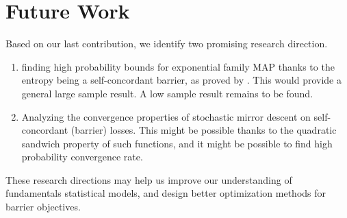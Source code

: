 \section{Future Work}
Based on our last contribution, we identify two promising research direction.
\begin{enumerate}
	\item finding high probability bounds for exponential family MAP thanks to the entropy being a self-concordant barrier, as proved by \citep{bubeck2015entropic}.
	This would provide a general large sample result. A low sample result remains to be found.
	\item Analyzing the convergence properties of  stochastic mirror descent on self-concordant (barrier) losses. This might be possible thanks to the quadratic sandwich property of such functions, and it might be possible to find high probability convergence rate. 
\end{enumerate}
These research directions may help us improve our understanding of fundamentals statistical models, and design better optimization methods  for barrier objectives.
